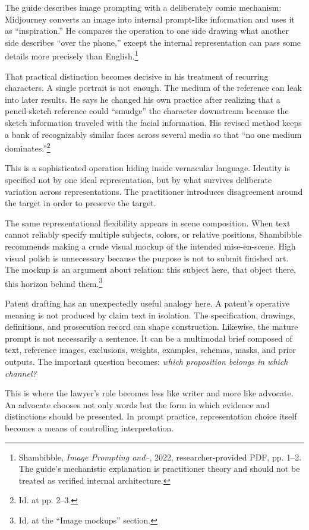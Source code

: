 \documentclass[11pt]{article}
\begin{document}
The guide describes image prompting with a deliberately comic mechanism: Midjourney converts an image into internal prompt-like information and uses it as ``inspiration.'' He compares the operation to one side drawing what another side describes ``over the phone,'' except the internal representation can pass some details more precisely than English.\footnote{Shambibble, \emph{Image Prompting and--}, 2022, researcher-provided PDF, pp. 1--2. The guide's mechanistic explanation is practitioner theory and should not be treated as verified internal architecture.}

That practical distinction becomes decisive in his treatment of recurring characters. A single portrait is not enough. The medium of the reference can leak into later results. He says he changed his own practice after realizing that a pencil-sketch reference could ``smudge'' the character downstream because the sketch information traveled with the facial information. His revised method keeps a bank of recognizably similar faces across several media so that ``no one medium dominates.''\footnote{Id. at pp. 2--3.}

This is a sophisticated operation hiding inside vernacular language. Identity is specified not by one ideal representation, but by what survives deliberate variation across representations. The practitioner introduces disagreement around the target in order to preserve the target.

The same representational flexibility appears in scene composition. When text cannot reliably specify multiple subjects, colors, or relative positions, Shambibble recommends making a crude visual mockup of the intended mise-en-scene. High visual polish is unnecessary because the purpose is not to submit finished art. The mockup is an argument about relation: this subject here, that object there, this horizon behind them.\footnote{Id. at the ``Image mockups'' section.}

Patent drafting has an unexpectedly useful analogy here. A patent's operative meaning is not produced by claim text in isolation. The specification, drawings, definitions, and prosecution record can shape construction. Likewise, the mature prompt is not necessarily a sentence. It can be a multimodal brief composed of text, reference images, exclusions, weights, examples, schemas, masks, and prior outputs. The important question becomes: \emph{which proposition belongs in which channel?}

This is where the lawyer's role becomes less like writer and more like advocate. An advocate chooses not only words but the form in which evidence and distinctions should be presented. In prompt practice, representation choice itself becomes a means of controlling interpretation.
\end{document}
